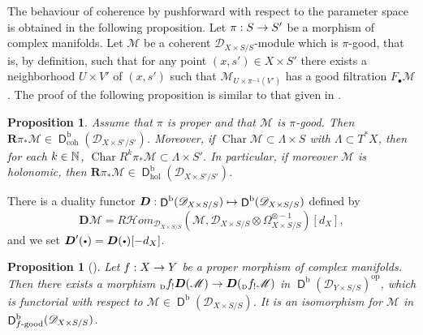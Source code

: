 \documentclass[english]{smfart}
\numberwithin{subsection}{section}
\def\shd{\mathcal{D}}\let\cD\shd
\def\shm{\mathcal{M}}
\newcommand{\bD}{\boldsymbol{D}}
\newcommand{\bR}{\boldsymbol{R}}
\newcommand{\Rhom}{R\shhom}
\newcommand{\shhom}{\mathcal{H}\!\mathit{om}}\let\ho\shhom
\newcommand{\rb}{\mathrm{b}}
\newcommand{\gr}{\mathrm{gr}}
\newcommand{\coh}{\mathrm{coh}}
\newcommand{\hol}{\mathrm{hol}}
\newcommand{\op}{\mathrm{op}}
\newcommand{\XS}{X\times S}
\newcommand{\DXS}{\shd_{\XS/S}}
\newcommand{\DXSp}{\shd_{\XS'/S'}}
\newcommand{\DYS}{\shd_{Y\times S/S}}
\DeclareMathOperator{\Char}{Char}
\DeclareMathOperator{\rD}{\mathsf{D}}
\newcommand{\Df}{{}_{\scriptscriptstyle\mathrm{D}}f}
\newcommand{\cbbullet}{{\raisebox{1pt}{$\sbullet$}}}
\newcommand{\sbullet}{{\scriptscriptstyle\bullet}}
\numberwithin{equation}{section}
\theoremstyle{plain}
\newtheorem{proposition}[equation]{Proposition}
\theoremstyle{definition}
\def\to{\mathchoice{\longrightarrow}{\rightarrow}{\rightarrow}{\rightarrow}}
\def\mto{\mathchoice{\longmapsto}{\mapsto}{\mapsto}{\mapsto}}
\begin{document}
The behaviour of coherence by pushforward with respect to the parameter space is obtained in the following proposition. Let $\pi:S\to S'$ be a morphism of complex manifolds. Let $\shm$ be a coherent $\DXS$-module which is $\pi$-good, that is, by definition, such that for any point $(x,s')\in\XS'$ there exists a neighborhood $U\times V'$ of $(x,s')$ such that $\shm_{U\times\pi^{-1}(V')}$ has a good filtration $F_\sbullet\shm$. The proof of the following proposition is similar to that given in \cite[\S4.7]{Kashiwara03}.

\begin{proposition}\label{prop:pushforward}
Assume that $\pi$ is proper and that $\shm$ is $\pi$-good. Then $\bR\pi_*\shm\in\rD^\rb_\coh(\DXSp)$. Moreover, if $\Char\shm\subset\Lambda\times S$ with $\Lambda\subset T^*X$, then for each $k\in\mathbb{N}$, $\Char R^k\pi_*\shm\subset\Lambda\times S'$. In particular, if moreover $\shm$ is holonomic, then $\bR\pi_*\shm\in\rD^\rb_\hol(\DXSp)$.
\end{proposition}

\begin{comment}
\begin{proof}
Since the problem is local on $\XS'$, we can assume that $\shm$ has a good filtration. Set $F_pR^k\pi_*\shm:=\text{image}[R^k\pi_*F_p\shm\to R^k\pi_*\shm]$. Then, by considering the spectral sequence for the pushforward and usual coherence arguments, the spectral sequence degenerates at a finite step and $\gr^FR^k\pi_*\shm$ is a subquotient of $R^k\pi_*\gr^F\shm$. One concludes that it is $\gr^F\DXSp$-coherent, hence the $\DXSp$-coherence of $R^k\pi_*\shm$. The assertion on the characteristic variety is obtained with the same argument.
\end{proof}
\end{comment}

There is a duality functor $\bD:\rD^\rb(\DXS)\mto\rD^\rb(\DXS)$ defined by
\[
\bD\shm=\Rhom_{\DXS}(\shm,\DXS\otimes\Omega^{\otimes-1}_{\XS/S})[d_X],
\]
and we set $\bD'(\cbbullet)=\bD(\cbbullet)[-d_X]$.

\begin{proposition}[{\cite[Prop.\,5.10, Th.\,5.15]{Sch-Sch94}}]\label{P:rel}
Let $f:X\to Y$ be a proper morphism of complex manifolds. Then there exists a morphism $\Df_!\bD(\shm)\to \bD(\Df_!\shm)$ in $\rD^\rb(\DYS)^{\op}$, which is functorial with respect to $\shm\in\rD^\rb(\DXS)$. It is an isomorphism for $\shm$ in $\rD^\rb_{f\textup{-good}}(\DXS)$.
\end{proposition}
\end{document}
